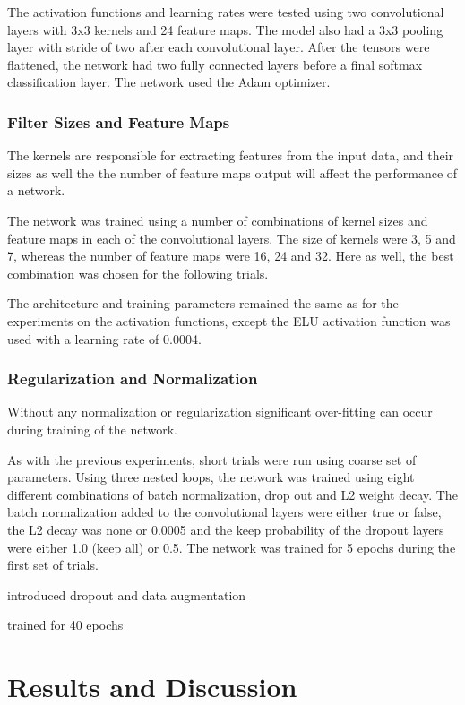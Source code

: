 \documentclass[]{article}
\begin{document}
The activation functions and learning rates were tested using two convolutional layers with 3x3 kernels and 24 feature maps. The model also had a 3x3 pooling layer with stride of two after each convolutional layer. After the tensors were flattened, the network had two fully connected layers before a final softmax classification layer. The network used the Adam optimizer. 

\subsubsection{Filter Sizes and Feature Maps}

The kernels are responsible for extracting features from the input data, and their sizes as well the the number of feature maps output will affect the performance of a network. 

The network was trained using a number of combinations of kernel sizes and feature maps in each of the convolutional layers. The size of kernels were 3, 5 and 7, whereas the number of feature maps were 16, 24 and 32. Here as well, the best combination was chosen for the following trials.

The architecture and training parameters remained the same as for the experiments on the activation functions, except the ELU activation function was used with a learning rate of 0.0004. 

\subsubsection{Regularization and Normalization}

Without any normalization or regularization significant over-fitting can occur during training of the network. 

As with the previous experiments, short trials were run using coarse set of parameters. Using three nested loops, the network was trained using eight different combinations of batch normalization, drop out and L2 weight decay. The batch normalization added to the convolutional layers were either true or false, the L2 decay was none or 0.0005 and the keep probability of the dropout layers were either 1.0 (keep all) or 0.5. The network was trained for 5 epochs during the first set of trials. 



introduced dropout and data augmentation

trained for 40 epochs
 
 
\section{Results and Discussion}
\end{document}
